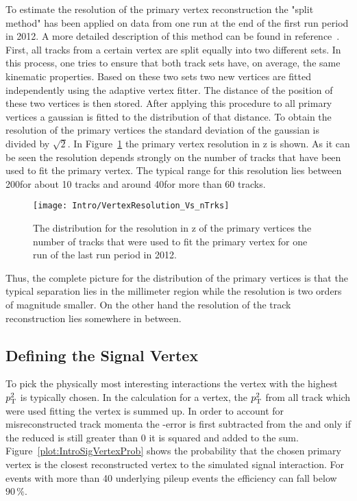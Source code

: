 To estimate the resolution of the primary vertex reconstruction the "split method" has been applied on data from one run at the end of the first run period in 2012. A more detailed description of this method can be found in reference~. First, all tracks from a certain vertex are split equally into two different sets. In this process, one tries to ensure that both track sets have, on average, the same kinematic properties. Based on these two sets two new vertices are fitted independently using the adaptive vertex fitter. The distance of the position of these two vertices is then stored. After applying this procedure to all primary vertices a gaussian is fitted to the distribution of that distance. To obtain the resolution of the primary vertices the standard deviation of the gaussian is divided by $\sqrt{2}$. In Figure~\ref{plot:IntroVertexRes} the primary vertex resolution in z is shown. As it can be seen the resolution depends strongly on the number of tracks that have been used to fit the primary vertex. The typical range for this resolution lies between 200\mum for about 10 tracks and around 40\mum for more than 60 tracks.

\begin{figure}[!Hhtb]
  \centering
  \texttt{[image: Intro/VertexResolution\_Vs\_nTrks]}
  \caption[Vertex resolution \vs number of used tracks]{The distribution for the resolution in z of the primary vertices \vs the number of tracks that were used to fit the primary vertex for one run of the last run period in 2012. \label{plot:IntroVertexRes}}
\end{figure}

Thus, the complete picture for the distribution of the primary vertices is that the typical separation lies in the millimeter region while the resolution is two orders of magnitude smaller. On the other hand the resolution of the track reconstruction lies somewhere in between.

\subsection{Defining the Signal Vertex\label{sec:IntroSigVer}}

To pick the physically most interesting interactions the vertex with the highest $p_{\mathrm{T}}^{2}$ is typically chosen. In the calculation for a vertex, the $p_{\mathrm{T}}^{2}$ from all track which were used fitting the vertex is summed up. In order to account for misreconstructed track momenta the \pt-error is first subtracted from the \pt and only if the reduced \pt is still greater than 0 it is squared and added to the sum. Figure~\ref{plot:IntroSigVertexProb} shows the probability that the chosen primary vertex is the closest reconstructed vertex to the simulated signal interaction. For events with more than 40 underlying pileup events the efficiency can fall below $90\,{}\%{}$.

